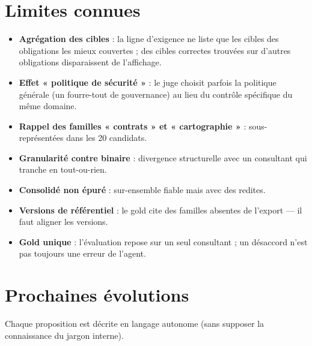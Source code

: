 \documentclass[11pt,a4paper]{report}
\begin{document}
\chapter{Limites connues}
\begin{itemize}
  \item \textbf{Agrégation des cibles} : la ligne d'exigence ne liste que les cibles des obligations les mieux couvertes ; des cibles correctes trouvées sur d'autres obligations disparaissent de l'affichage.
  \item \textbf{Effet « politique de sécurité »} : le juge choisit parfois la politique générale (un fourre-tout de gouvernance) au lieu du contrôle spécifique du même domaine.
  \item \textbf{Rappel des familles « contrats » et « cartographie »} : sous-représentées dans les 20 candidats.
  \item \textbf{Granularité contre binaire} : divergence structurelle avec un consultant qui tranche en tout-ou-rien.
  \item \textbf{Consolidé non épuré} : sur-ensemble fiable mais avec des redites.
  \item \textbf{Versions de référentiel} : le gold cite des familles absentes de l'export --- il faut aligner les versions.
  \item \textbf{Gold unique} : l'évaluation repose sur un seul consultant ; un désaccord n'est pas toujours une erreur de l'agent.
\end{itemize}

\chapter{Prochaines évolutions}

Chaque proposition est décrite en langage autonome (sans supposer la connaissance du jargon interne).
\end{document}

